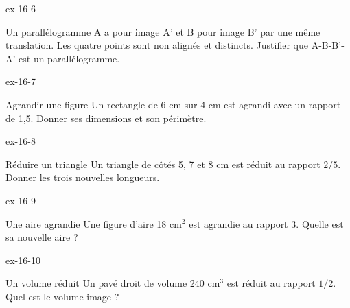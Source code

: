 \begin{blocLivre}{ex-16-6}\begin{exercice}[2]{Un parallélogramme}
A a pour image A’ et B pour image B’ par une même translation. Les quatre points sont non alignés et distincts. Justifier que A-B-B’-A’ est un parallélogramme.
\label{fig-ex-16-6}
\end{exercice}\end{blocLivre}
\begin{blocLivre}{ex-16-7}\begin{exercice}[2]{Agrandir une figure}
Un rectangle de 6 cm sur 4 cm est agrandi avec un rapport de 1,5. Donner ses dimensions et son périmètre.
\label{fig-ex-16-7}
\end{exercice}\end{blocLivre}
\begin{blocLivre}{ex-16-8}\begin{exercice}[2]{Réduire un triangle}
Un triangle de côtés 5, 7 et 8 cm est réduit au rapport $2/5$. Donner les trois nouvelles longueurs.
\label{fig-ex-16-8}
\end{exercice}\end{blocLivre}
\begin{blocLivre}{ex-16-9}\begin{exercice}[2]{Une aire agrandie}
Une figure d’aire 18 cm$^2$ est agrandie au rapport 3. Quelle est sa nouvelle aire ?
\label{fig-ex-16-9}
\end{exercice}\end{blocLivre}
\begin{blocLivre}{ex-16-10}\begin{exercice}[2]{Un volume réduit}
Un pavé droit de volume 240 cm$^3$ est réduit au rapport $1/2$. Quel est le volume image ?
\label{fig-ex-16-10}
\end{exercice}\end{blocLivre}

